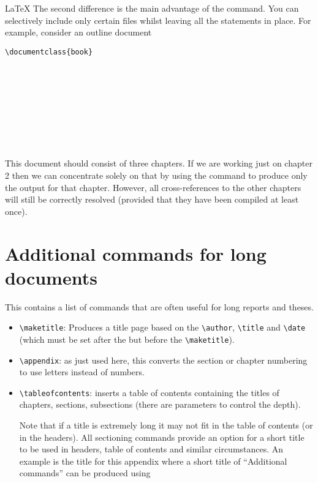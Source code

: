 \begin{chapter}{\LaTeX}
The second difference is the main advantage of the \verb|| command. You can selectively include only certain files whilst leaving all the \verb|| statements in place. For example, consider an outline document
%
\begin{verbatim}
\documentclass{book}










\end{verbatim}
%
This document should consist of three chapters. If we are working just on chapter 2 then we can concentrate solely on that by using the \verb|| command to produce only the output for that chapter. However, all cross-references to the other chapters will still be correctly resolved (provided that they have been compiled at least once).

\section[Additional commands]{Additional commands for long documents}
\label{sec:additional}

This contains a list of commands that are often useful for long reports and theses.
%
\begin{itemize}
\item \verb|\maketitle|: Produces a title page based on the \verb|\author|, \verb|\title| and \verb|\date| (which must be set after the \verb|| but before the \verb|\maketitle|).
\item \verb|\appendix|: as just used here, this converts the section or chapter numbering to use letters instead of numbers.
\item \verb|\tableofcontents|: inserts a table of contents containing the titles of chapters, sections, subsections (there are parameters to control the depth).

Note that if a title is extremely long it may not fit in the table of contents (or in the headers). All sectioning commands provide an option for a short title to be used in headers, table of contents and similar circumstances. An example is the title for this appendix where a short title of ``Additional commands'' can be produced using
\begin{verbatim}

\end{verbatim}
\end{itemize}
\end{chapter}
